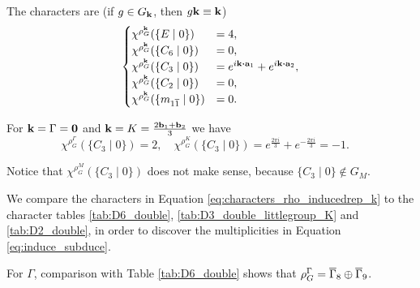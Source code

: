 The characters are (if $g \in G_{\vb{k}}$, then $g {\vb{k}} \equiv {\vb{k}}$)
\begin{align} \label{eq:characters_rho_inducedrep_k}
\begin{cases}
\chi^{\rho_G^\k}(\{E\mid 0\}) &= 4, \\
\chi^{\rho_G^\k}(\{C_6\mid 0\}) &= 0, \\
\chi^{\rho_G^\k}(\{C_3\mid 0\}) &= e^{i \k \vdot \a_1} + e^{i \k \vdot \a_2}, \\
\chi^{\rho_G^\k}(\{C_2\mid 0\}) &= 0, \\
\chi^{\rho_G^\k}(\{m_{1\cc{1}}\mid 0\}) &= 0.
\end{cases}
\end{align}

For ${\vb{k}} = \Gamma = {\vb{0}}$ and ${\vb{k}} = K = \frac{2{\vb{b}}_1 + {\vb{b}}_2}{3}$ we have
\begin{equation} \label{eq:characters_rhoC3_k_Gamma_K}
\chi^{\rho_G^\Gamma}(\{C_3\mid 0\}) = 2, \quad
\chi^{\rho_G^K}(\{C_3\mid 0\}) = e^{\frac{2\pi i}{3}} + e^{-\frac{2\pi i}{3}} = -1. \quad
\end{equation}

Notice that $\chi^{\rho_G^M}(\{C_3\mid 0\})$ does not make sense, because $\{C_3\mid 0\} \notin G_M$.

\n

We compare the characters in Equation \ref{eq:characters_rho_inducedrep_k} to the character tables \ref{tab:D6_double}, \ref{tab:D3_double_littlegroup_K} and \ref{tab:D2_double}, in order to discover the multiplicities in Equation \ref{eq:induce_subduce}.

For $\Gamma$, comparison with Table \ref{tab:D6_double} shows that $\rho_G^{\Gamma} = \overline{\Gamma}_8 \oplus \overline{\Gamma}_9$.

